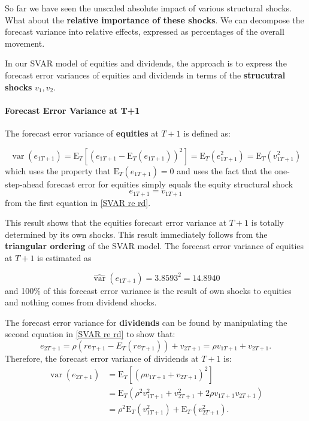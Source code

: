 \documentclass[11pt]{article}
\begin{document}
So far we have seen the unscaled absolute impact of various structural shocks. What about the \textbf{relative importance of these shocks}. We can decompose the forecast variance into relative effects, expressed as percentages of the overall movement.

In our SVAR model of equities and dividends, the approach is to express the forecast error variances of equities and dividends in terms of the \textbf{strucutral shocks} $v_1,v_2$.

\paragraph{Forecast Error Variance at T+1} \mbox{}

The forecast error variance of \textbf{equities} at $T+1$ is defined as:

\begin{equation}
\operatorname{var}\left(e_{1 T+1}\right)=\mathrm{E}_T\left[\left(e_{1 T+1}-\mathrm{E}_T\left(e_{1 T+1}\right)\right)^2\right]=\mathrm{E}_T\left(e_{1 T+1}^2\right)=\mathrm{E}_T\left(v_{1 T+1}^2\right)
\end{equation}
which uses the property that $\mathrm{E}_T\left(e_{1 T+1}\right)=0$ and uses the fact that the one-step-ahead forecast error for equities simply equals the equity structural shock
\[e_{1T+1} = v_{1T+1}\]
from the first equation in \eqref{SVAR re rd}. 

This result shows that the equities forecast error variance at $T+1$ is totally determined by its own shocks. This result immediately follows from the \textbf{triangular ordering} of the SVAR model. The forecast error variance of equities at $T+1$ is estimated as

\begin{equation}
\widehat{\operatorname{var}}\left(e_{1 T+1}\right)=3.8593^2=14.8940
\end{equation}
and 100\% of this forecast error variance is the result of own shocks to equities and nothing comes from dividend shocks.

The forecast error variance for \textbf{dividends} can be found by manipulating the second equation in \eqref{SVAR re rd} to show that:
\begin{equation}
e_{2 T+1}=\rho\left(r e_{T+1}-E_T\left(r e_{T+1}\right)\right)+v_{2 T+1}=\rho v_{1 T+1}+v_{2 T+1} .
\end{equation}
Therefore, the forecast error variance of dividends at $T+1$ is:
\begin{equation}
\begin{aligned}
\operatorname{var}\left(e_{2 T+1}\right) & =\mathrm{E}_T\left[\left(\rho v_{1 T+1}+v_{2 T+1}\right)^2\right] \\
& =\mathrm{E}_T\left(\rho^2 v_{1 T+1}^2+v_{2 T+1}^2+2 \rho v_{1 T+1} v_{2 T+1}\right) \\
& =\rho^2 \mathrm{E}_T\left(v_{1 T+1}^2\right)+\mathrm{E}_T\left(v_{2 T+1}^2\right) .
\end{aligned}
\end{equation}
\end{document}

